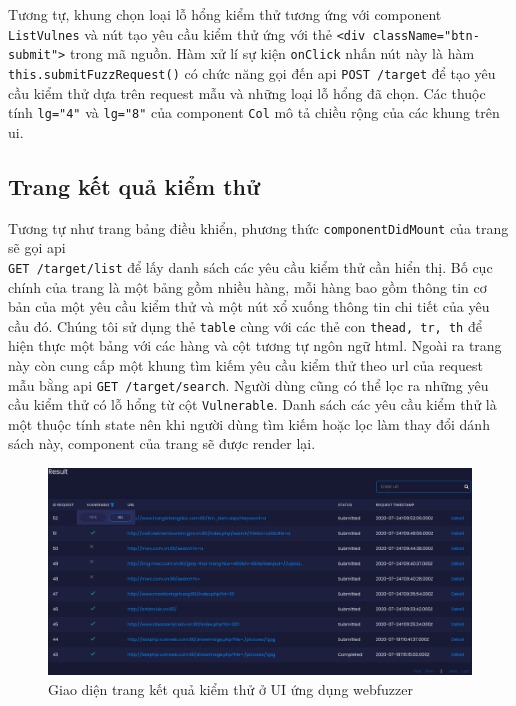\FloatBarrier
Tương tự, khung chọn loại lỗ hổng kiểm thử tương ứng với component \texttt{ListVulnes} và nút tạo yêu cầu kiểm thử ứng với thẻ \texttt{<div className="btn-submit">} trong mã nguồn. Hàm xử lí sự kiện \texttt{onClick} nhấn nút này là hàm \texttt{this.submitFuzzRequest()} có chức năng gọi đến \acrshort{api} \colorbox{gray!30}{\texttt{POST /target}} để tạo yêu cầu kiểm thử dựa trên request mẫu và những loại lỗ hổng đã chọn. Các thuộc tính \texttt{lg="4"} và \texttt{lg="8"} của component \texttt{Col} mô tả chiều rộng của các khung trên \acrshort{ui}. 

\subsection{Trang kết quả kiểm thử}
Tương tự như trang bảng điều khiển, phương thức \texttt{componentDidMount} của trang sẽ gọi \acrshort{api}\\\colorbox{gray!30}{\texttt{GET /target/list}} để lấy danh sách các yêu cầu kiểm thử cần hiển thị. Bố cục chính của trang là một bảng gồm nhiều hàng, mỗi hàng bao gồm thông tin cơ bản của một yêu cầu kiểm thử và một nút xổ xuống thông tin chi tiết của yêu cầu đó. Chúng tôi sử dụng thẻ \texttt{table} cùng với các thẻ con \texttt{thead, tr, th} để hiện thực một bảng với các hàng và cột tương tự ngôn ngữ \acrshort{html}. Ngoài ra trang này còn cung cấp một khung tìm kiếm yêu cầu kiểm thử theo \acrshort{url} của request mẫu bằng \acrshort{api} \colorbox{gray!30}{\texttt{GET /target/search}}. Người dùng cũng có thể lọc ra những yêu cầu kiểm thử có lỗ hổng từ cột \texttt{Vulnerable}. Danh sách các yêu cầu kiểm thử là một thuộc tính state nên khi người dùng tìm kiếm hoặc lọc làm thay đổi dánh sách này, component của trang sẽ được render lại.\par
\FloatBarrier
\begin{figure}
    \centering
        \includegraphics[scale=0.44,keepaspectratio=true]{images/result-ui.png}
    \caption{Giao diện trang kết quả kiểm thử ở UI ứng dụng webfuzzer}
    \label{fig:result-ui-ui}
\end{figure}
